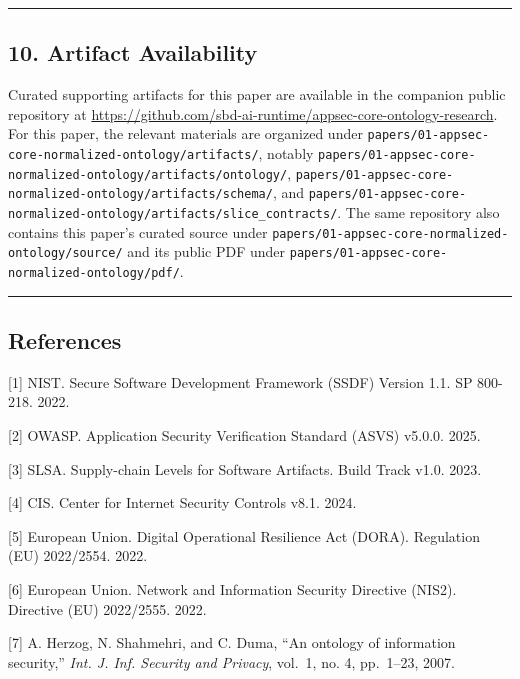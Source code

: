 \documentclass[
]{article}
\begin{document}
\begin{center}\rule{0.5\linewidth}{0.5pt}\end{center}

\subsection{10. Artifact Availability}\label{artifact-availability}

Curated supporting artifacts for this paper are available in the
companion public repository at
\url{https://github.com/sbd-ai-runtime/appsec-core-ontology-research}.
For this paper, the relevant materials are organized under
\texttt{papers/01-appsec-core-normalized-ontology/artifacts/}, notably
\texttt{papers/01-appsec-core-normalized-ontology/artifacts/ontology/},
\texttt{papers/01-appsec-core-normalized-ontology/artifacts/schema/},
and
\texttt{papers/01-appsec-core-normalized-ontology/artifacts/slice\_contracts/}.
The same repository also contains this paper's curated source under
\texttt{papers/01-appsec-core-normalized-ontology/source/} and its
public PDF under
\texttt{papers/01-appsec-core-normalized-ontology/pdf/}.

\begin{center}\rule{0.5\linewidth}{0.5pt}\end{center}

\subsection{References}\label{references}

{[}1{]} NIST. Secure Software Development Framework (SSDF) Version 1.1.
SP 800-218. 2022.

{[}2{]} OWASP. Application Security Verification Standard (ASVS) v5.0.0.
2025.

{[}3{]} SLSA. Supply-chain Levels for Software Artifacts. Build Track
v1.0. 2023.

{[}4{]} CIS. Center for Internet Security Controls v8.1. 2024.

{[}5{]} European Union. Digital Operational Resilience Act (DORA).
Regulation (EU) 2022/2554. 2022.

{[}6{]} European Union. Network and Information Security Directive
(NIS2). Directive (EU) 2022/2555. 2022.

{[}7{]} A. Herzog, N. Shahmehri, and C. Duma, ``An ontology of
information security,'' \emph{Int. J. Inf. Security and Privacy},
vol.~1, no. 4, pp.~1--23, 2007.
\end{document}
